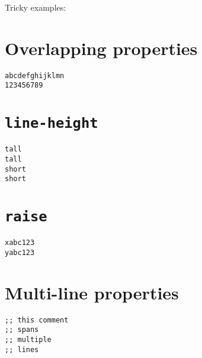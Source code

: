 \documentclass{article}
\begin{document}
Tricky examples:

\section*{Overlapping properties}
\begin{verbatim}
abcdefghijklmn
123456789
\end{verbatim}

\section*{\texttt{line-height}}
\begin{verbatim}
tall
tall
short
short
\end{verbatim}

\section*{\texttt{raise}}
\begin{verbatim}
xabc123
yabc123
\end{verbatim}

\section*{Multi-line properties}
\begin{verbatim}
;; this comment
;; spans
;; multiple
;; lines
\end{verbatim}
\end{document}
